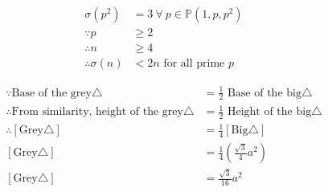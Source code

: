 \documentclass{article}
\begin{document}
\begin{custom-big}[Problem D]
\begin{align*}
    \sigma\left(p^2\right)&=3\ \forall \ p\in\mathbb{P}\left(1,p,p^2\right)\\
\because p&\ge 2\\
\therefore n&\ge 4\\
\therefore \sigma\left(n\right)&<2n\text{ for all prime }p
\end{align*}
\end{custom-big}


\begin{custom-big}[Problem E]
\begin{align*}
    \because \text{Base of the grey}\triangle &=\frac 1 2\text{ Base of the big}\triangle\\
    \therefore\text{From similarity, height of the grey}\triangle &=\frac 1 2\text{ Height of the big}\triangle\\
    \therefore \left[\text{Grey}\triangle\right]&=\frac 14\left[\text{Big}\triangle\right]\\
    \left[\text{Grey}\triangle\right]&=\frac 14\left(\frac{\sqrt{3}}{4}a^2\right)\\
    \left[\text{Grey}\triangle\right]&=\boxed{\frac{\sqrt{3}}{16}a^2}
\end{align*}
\end{custom-big}
\end{document}

